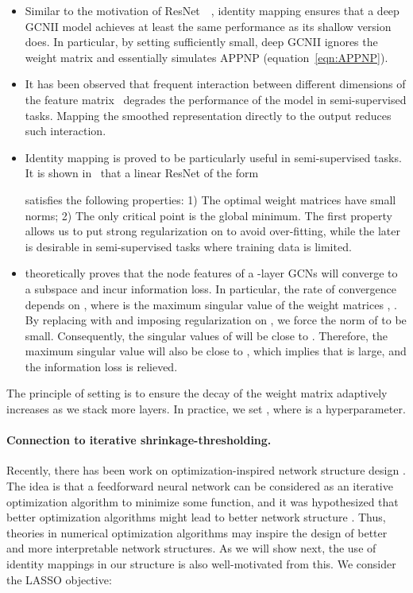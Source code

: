 \documentclass{article}
\begin{document}
\begin{itemize}
\item Similar to the motivation of ResNet~~\cite{DBLP:conf/cvpr/HeZRS16},
identity mapping ensures that a deep GCNII model
achieves at
least the same performance as its shallow version does. In particular, by setting
 sufficiently small, deep GCNII ignores the weight matrix
 and essentially simulates APPNP (equation~\eqref{eqn:APPNP}).

\item It has been observed that frequent interaction between
  different dimensions of the feature
  matrix~\cite{klicpera_predict_2019} degrades the performance of the
  model in semi-supervised tasks.  Mapping the
smoothed representation   directly to the output reduces such interaction.

\item Identity
mapping is proved to be particularly useful in  semi-supervised tasks.
It is shown in~\cite{DBLP:conf/iclr/HardtM17} that a linear ResNet of the form

satisfies the following properties: 
  1) The optimal weight matrices  have small norms;
  2)  The only critical point is the global minimum.  The
  first property allows us to put strong regularization on
   to avoid over-fitting, while the later is desirable in
  semi-supervised tasks where training data is limited.
  
\item
\cite{oono2020graph} theoretically proves that the
node features of a -layer GCNs will converge to a subspace and incur
information loss. In particular, the rate of convergence depends on   , where  is the maximum singular value of
  the weight matrices , . By replacing
   with  and imposing regularization on ,
  we force the norm of  to be small.
  Consequently,  the singular values of  will be close to . Therefore, the maximum
  singular value  will also be close to , which implies that 
  is large, and the information loss is relieved.
\end{itemize}
The principle of setting  is to ensure  the decay of the
weight matrix adaptively increases as we stack more layers. 
  In practice, we set ,  where  is a
  hyperparameter. 


\paragraph{Connection to  iterative shrinkage-thresholding.}
Recently, there has been work on optimization-inspired network structure design \cite{DBLP:conf/cvpr/ZhangG18,papyan2017convolutional}. The idea is that a feedforward neural network can be considered as an iterative optimization algorithm to minimize some function, and it was hypothesized that better optimization algorithms might lead to better network structure \cite{li2018optimization}. Thus, theories in numerical optimization algorithms may inspire the design of better and more interpretable network structures. As we will show next, the use of identity mappings in our structure is also well-motivated from this.  We consider the LASSO objective:
\end{document}
